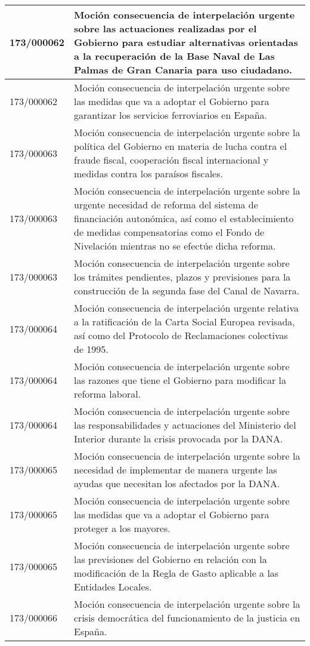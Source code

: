 {\begin{table}[H]
\begin{center}
\begin{tabularx}{\linewidth}{| l | X |}
\hline
173/000062 & Moción consecuencia de interpelación urgente sobre las actuaciones realizadas por el Gobierno para estudiar alternativas orientadas a la recuperación de la Base Naval de Las Palmas de Gran Canaria para uso ciudadano. \\
\hline
173/000062 & Moción consecuencia de interpelación urgente sobre las medidas que va a adoptar el Gobierno para garantizar los servicios ferroviarios en España. \\
\hline
173/000063 & Moción consecuencia de interpelación urgente sobre la política del Gobierno en materia de lucha contra el fraude fiscal, cooperación fiscal internacional y medidas contra los paraísos fiscales. \\
\hline
173/000063 & Moción consecuencia de interpelación urgente sobre la urgente necesidad de reforma del sistema de financiación autonómica, así como el establecimiento de medidas compensatorias como el Fondo de Nivelación mientras no se efectúe dicha reforma. \\
\hline
173/000063 & Moción consecuencia de interpelación urgente sobre los trámites pendientes, plazos y previsiones para la construcción de la segunda fase del Canal de Navarra. \\
\hline
173/000064 & Moción consecuencia de interpelación urgente relativa a la ratificación de la Carta Social Europea revisada, así como del Protocolo de Reclamaciones colectivas de 1995. \\
\hline
173/000064 & Moción consecuencia de interpelación urgente sobre las razones que tiene el Gobierno para modificar la reforma laboral. \\
\hline
173/000064 & Moción consecuencia de interpelación urgente sobre las responsabilidades y actuaciones del Ministerio del Interior durante la crisis provocada por la DANA. \\
\hline
173/000065 & Moción consecuencia de interpelación urgente sobre la necesidad de implementar de manera urgente las ayudas que necesitan los afectados por la DANA. \\
\hline
173/000065 & Moción consecuencia de interpelación urgente sobre las medidas que va a adoptar el Gobierno para proteger a los mayores. \\
\hline
173/000065 & Moción consecuencia de interpelación urgente sobre las previsiones del Gobierno en relación con la modificación de la Regla de Gasto aplicable a las Entidades Locales. \\
\hline
173/000066 & Moción consecuencia de interpelación urgente sobre la crisis democrática del funcionamiento de la justicia en España. \\

\end{tabularx}
\end{center}
\end{table}}
